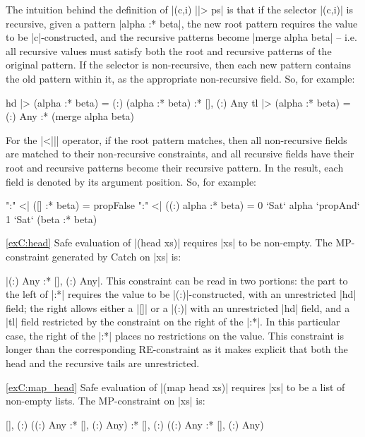 The intuition behind the definition of |(c,i) ||> ps| is that if the selector |(c,i)| is recursive, given a pattern |alpha :* beta|, the new root pattern requires the value to be |c|-constructed, and the recursive patterns become |merge alpha beta| -- i.e. all recursive values must satisfy both the root and recursive patterns of the original pattern. If the selector is non-recursive, then each new pattern contains the old pattern within it, as the appropriate non-recursive field. So, for example:

\ignore\begin{code}
hd  |> (alpha :* beta) = {(:) (alpha :* beta)  } :* {[], (:) Any}
tl  |> (alpha :* beta) = {(:) Any              } :* (merge alpha beta)
\end{code}

For the |<||| operator, if the root pattern matches, then all non-recursive fields are matched to their non-recursive constraints, and all recursive fields have their root and recursive patterns become their recursive pattern. In the result, each field is denoted by its argument position. So, for example:

\ignore\begin{code}
":" <| ({[]         } :* beta) = propFalse
":" <| ({(:) alpha  } :* beta) = 0 `Sat` alpha `propAnd` 1 `Sat` (beta :* beta)
\end{code}

\begin{examplerevisit}{\ref{exC:head}} Safe evaluation of |(head xs)| requires |xs| to be non-empty. The MP-constraint generated by Catch on |xs| is: \ignore|{(:) Any} :* {[], (:) Any}|. This constraint can be read in two portions: the part to the left of |:*| requires the value to be |(:)|-constructed, with an unrestricted |hd| field; the right allows either a |[]| or a |(:)| with an unrestricted |hd| field, and a |tl| field restricted by the constraint on the right of the |:*|. In this particular case, the right of the |:*| places no restrictions on the value. This constraint is longer than the corresponding RE-constraint as it makes explicit that both the head and the recursive tails are unrestricted.
\end{examplerevisit}

\begin{examplerevisit}{\ref{exC:map_head}} Safe evaluation of |(map head xs)| requires |xs| to be a list of non-empty lists. The MP-constraint on |xs| is:

\ignore\begin{code}
{[], (:) ({(:) Any} :* {[], (:) Any})} :*
{[], (:) ({(:) Any} :* {[], (:) Any})}
\end{code}
\end{examplerevisit}

